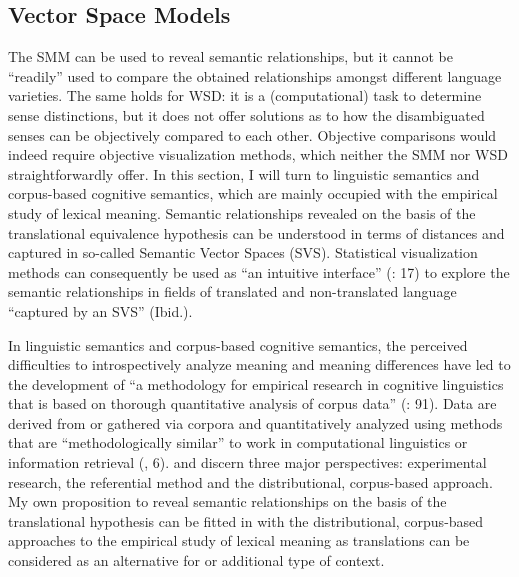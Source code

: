 \subsection{\label{sec:2.4.2}  Vector Space Models}

The SMM can be used to reveal semantic relationships, but it cannot be “readily” used to compare the obtained relationships amongst different language varieties. The same holds for WSD: it is a (computational) task to determine sense distinctions, but it does not offer solutions as to how the disambiguated senses can be objectively compared to each other. Objective comparisons would indeed require objective visualization methods, which neither the SMM nor WSD straightforwardly offer. In this section, I will turn to linguistic semantics and corpus-based cognitive semantics, which are mainly occupied with the empirical study of lexical meaning. Semantic relationships revealed on the basis of the translational equivalence hypothesis can be understood in terms of distances and captured in so-called Semantic Vector Spaces (SVS). Statistical visualization methods can consequently be used as “an intuitive interface” (\citealt{heylen_looking_2012}: 17) to explore the semantic relationships in fields of translated and non-translated language “captured by an SVS” (Ibid.).



In linguistic semantics and corpus-based cognitive semantics, the perceived difficulties to introspectively analyze meaning and meaning differences have led to the development of “a methodology for empirical research in cognitive linguistics that is based on thorough quantitative analysis of corpus data” (\citealt{kristiansen_methodological_2008}: 91). Data are derived from or gathered via corpora and quantitatively analyzed using methods that are “methodologically similar” to work in computational linguistics or information retrieval (\citealt{gries_introduction_2006}, 6). \citet[242]{riemer_sense_2016} and \citet{glynn_empirical_2010} discern three major perspectives: experimental research, the referential method and the distributional, corpus-based approach. My own proposition to reveal semantic relationships on the basis of the translational hypothesis can be fitted in with the distributional, corpus-based approaches to the empirical study of lexical meaning as translations can be considered as an alternative for or additional type of context.



